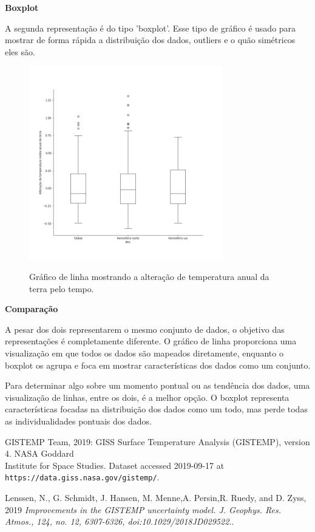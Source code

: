 \documentclass[12pt]{article}
\begin{document}
\textbf{\Large Boxplot}\par
A segunda representação é do tipo 'boxplot'. Esse tipo de gráfico é usado para mostrar de forma rápida a distribuição dos dados, outliers e o quão simétricos eles são.
\setcounter{figure}{1}
\begin{figure}[H]
	\centering
	\includegraphics[width = 0.75\textwidth]{boxplot.png}
	\label{fig:A.2}
	\caption{Gráfico de linha mostrando a alteração de temperatura anual da terra pelo tempo.}
\end{figure}

\textbf{\Large Comparação} \par
A pesar dos dois representarem o mesmo conjunto de dados, o objetivo das representações é completamente diferente. O gráfico de linha proporciona uma visualização em que todos os dados são mapeados diretamente, enquanto o boxplot os agrupa e foca em mostrar características dos dados como um conjunto. \par
Para determinar algo sobre um momento pontual ou as tendência dos dados, uma visualização de linhas, entre os dois, é a melhor opção. O boxplot representa características focadas na distribuição dos dados como um todo, mas perde todas as individualidades pontuais dos dados.

\newpage
\begin{thebibliography}{9}
	GISTEMP Team, 2019: GISS Surface Temperature Analysis (GISTEMP), version 4. NASA Goddard \\
	Institute for Space Studies. Dataset accessed 2019-09-17 at \\\texttt{https://data.giss.nasa.gov/gistemp/}.
	
	Lenssen, N., G. Schmidt, J. Hansen, M. Menne,A. Persin,R. Ruedy, and D. Zyss, 2019 
	\textit{Improvements in the GISTEMP uncertainty model. J. Geophys. Res. Atmos., 124, no. 12, 6307-6326, doi:10.1029/2018JD029522.}.
\end{thebibliography}
\end{document}

